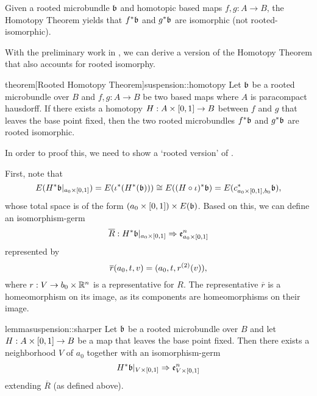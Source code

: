 \begin{myparagraph}
    Given a rooted microbundle $\bb$ and homotopic based maps $f, g: A \to B$,
    the Homotopy Theorem yields that $\ind{f}\bb$ and $\ind{g}\bb$
    are isomorphic (not rooted-isomorphic).
    
    With the preliminary work in , we can derive
    a version of the Homotopy Theorem that also accounts for rooted isomorphy.
\end{myparagraph}

\begin{mystatement}{theorem}[Rooted Homotopy Theorem]{suspension::homotopy}
    Let $\bb$ be a rooted microbundle over $B$ and $f, g: A \to B$ be two based maps
    where $A$ is paracompact hausdorff.
    If there exists a homotopy $H: A \times{} [0, 1] \to B$ between $f$ and $g$ that leaves the base point fixed,
    then the two rooted microbundles $\ind{f}\bb$ and $\ind{g}\bb$ are rooted isomorphic.
\end{mystatement}

\begin{myparagraph}
    In order to proof this,
    we need to show a `rooted version' of .
    
    First, note that 
    \[
        E(\ind{H}\bb[\cyl{a_0}]) = E(\ind{\iota}(\ind{H}(\bb)))
        \cong E(\ind{(H \circ \iota)}\bb) = E(\ind{c_{\cyl{a_0}, b_0}}\bb),
    \]
    whose total space is of the form $(a_0 \cross [0, 1]) \cross E(\bb)$.
    Based on this, we can define an isomorphism-germ
    \[ \germdef{\overline{R}}{\ind{H}\bb[\cyl{a_0}]}{\be{\cyl{a_0}}} \]
    represented by
    \[ \overline{r}(a_0, t, v) = (a_0, t, r^{(2)}(v)), \]
    where $r: V \to b_0 \times \mathbb{R}^n$ is a representative for $R$.
    The representative $\overline{r}$ is a homeomorphism on its image,
    as its components are homeomorphisms on their image. 
\end{myparagraph}

\begin{mystatement}{lemma}{suspension::sharper}
    Let $\bb$ be a rooted microbundle over $B$ and
    let $H: A \times{} [0, 1] \to B$ be a map that leaves the base point fixed.
    Then there exists a neighborhood $V$ of $a_0$ together with an isomorphism-germ
    \[ \germ{\ind{H}\bb[\cyl{V}]}{\be{\cyl{V}}} \]
    extending $\overline{R}$ (as defined above).
\end{mystatement}

